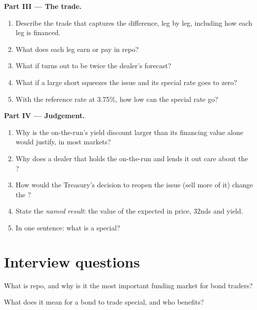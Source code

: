 \begin{problem}
\medskip\noindent\textbf{Part III --- The trade.}
\begin{enumerate}[resume]
\item Describe the trade that captures the difference, leg by leg, including
how each leg is financed.
\item What does each leg earn or pay in repo?
\item What if  turns out to be twice the dealer's forecast?
\item What if a large short squeezes the issue and its special rate goes to
zero?
\item With the reference rate at 3.75\%, how low can the special rate go?
\end{enumerate}

\medskip\noindent\textbf{Part IV --- Judgement.}
\begin{enumerate}[resume]
\item Why is the on-the-run's yield discount larger than its financing value
alone would justify, in most markets?
\item Why does a dealer that holds the on-the-run and lends it out care about
the ?
\item How would the Treasury's decision to reopen the issue (sell more of it)
change the ?
\item State the \emph{named result}: the value of the expected  in
price, 32nds and yield.
\item In one sentence: what is a special?
\end{enumerate}
\end{problem}

\section{Interview questions}

\begin{interviewq}\label{iq:m2:repo-and-specials:1}
What is repo, and why is it the most important funding market for bond
traders?
\end{interviewq}

\begin{interviewq}\label{iq:m2:repo-and-specials:2}
What does it mean for a bond to trade special, and who benefits?
\end{interviewq}

